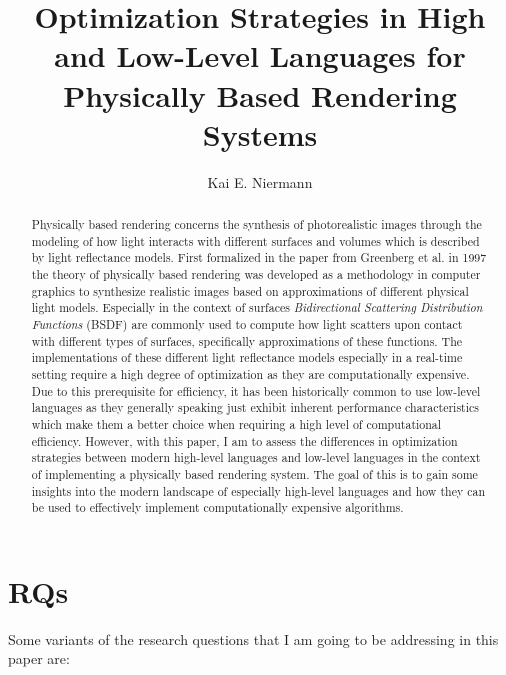 \documentclass[11pt,a4paper,oneside]{article}
\begin{document}

\title{
    \textbf{Optimization Strategies in High and Low-Level Languages for Physically Based Rendering Systems}
}
\author{
Kai E. Niermann 
}
\date{}
\maketitle
% 

\begin{abstract}
    Physically based rendering concerns the synthesis of photorealistic images through the modeling of how light interacts with different surfaces and volumes which is described by light reflectance models. First formalized in the paper from Greenberg et al. \cite{10.1145/310930.310970} in 1997 the theory of physically based rendering was developed as a methodology in computer graphics to synthesize realistic images based on approximations of different physical light models. Especially in the context of surfaces \textit{Bidirectional Scattering Distribution Functions} (BSDF) are commonly used to compute how light scatters upon contact with different types of surfaces, specifically approximations of these functions. The implementations of these different light reflectance models especially in a real-time setting require a high degree of optimization as they are computationally expensive. Due to this prerequisite for efficiency, it has been historically common to use low-level languages as they generally speaking just exhibit inherent performance characteristics which make them a better choice when requiring a high level of computational efficiency. However, with this paper, I am to assess the differences in optimization strategies between modern high-level languages and low-level languages in the context of implementing a physically based rendering system. The goal of this is to gain some insights into the modern landscape of especially high-level languages and how they can be used to effectively implement computationally expensive algorithms. 
\end{abstract}

\section{RQs}

Some variants of the research questions that I am going to be addressing in this paper are:
\end{document}
